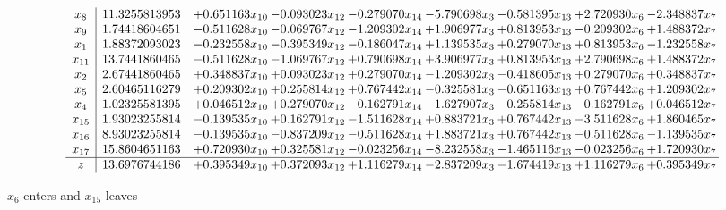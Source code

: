 \documentclass[10pt]{article}
\begin{document}
 \[\begin{array}{c| c c@{\hskip 2pt} c@{\hskip 2pt} c@{\hskip 2pt} c@{\hskip 2pt} c@{\hskip 2pt} c@{\hskip 2pt} c@{\hskip 2pt} }
 x_{8}   &  11.3255813953 & + 0.651163 x_{10} & -0.093023 x_{12} & -0.279070 x_{14} & -5.790698 x_{3} & -0.581395 x_{13} & + 2.720930 x_{6} & -2.348837 x_{7}\\
 x_{9}   &  1.74418604651 & -0.511628 x_{10} & -0.069767 x_{12} & -1.209302 x_{14} & + 1.906977 x_{3} & + 0.813953 x_{13} & -0.209302 x_{6} & + 1.488372 x_{7}\\
 x_{1}   &  1.88372093023 & -0.232558 x_{10} & -0.395349 x_{12} & -0.186047 x_{14} & + 1.139535 x_{3} & + 0.279070 x_{13} & + 0.813953 x_{6} & -1.232558 x_{7}\\
 x_{11}   &  13.7441860465 & -0.511628 x_{10} & -1.069767 x_{12} & + 0.790698 x_{14} & + 3.906977 x_{3} & + 0.813953 x_{13} & + 2.790698 x_{6} & + 1.488372 x_{7}\\
 x_{2}   &  2.67441860465 & + 0.348837 x_{10} & + 0.093023 x_{12} & + 0.279070 x_{14} & -1.209302 x_{3} & -0.418605 x_{13} & + 0.279070 x_{6} & + 0.348837 x_{7}\\
 x_{5}   &  2.60465116279 & + 0.209302 x_{10} & + 0.255814 x_{12} & + 0.767442 x_{14} & -0.325581 x_{3} & -0.651163 x_{13} & + 0.767442 x_{6} & + 1.209302 x_{7}\\
 x_{4}   &  1.02325581395 & + 0.046512 x_{10} & + 0.279070 x_{12} & -0.162791 x_{14} & -1.627907 x_{3} & -0.255814 x_{13} & -0.162791 x_{6} & + 0.046512 x_{7}\\
 x_{15}   &  1.93023255814 & -0.139535 x_{10} & + 0.162791 x_{12} & -1.511628 x_{14} & + 0.883721 x_{3} & + 0.767442 x_{13} & -3.511628 x_{6} & + 1.860465 x_{7}\\
 x_{16}   &  8.93023255814 & -0.139535 x_{10} & -0.837209 x_{12} & -0.511628 x_{14} & + 1.883721 x_{3} & + 0.767442 x_{13} & -0.511628 x_{6} & -1.139535 x_{7}\\
 x_{17}   &  15.8604651163 & + 0.720930 x_{10} & + 0.325581 x_{12} & -0.023256 x_{14} & -8.232558 x_{3} & -1.465116 x_{13} & -0.023256 x_{6} & + 1.720930 x_{7}\\
\hline
z    &  13.6976744186 & + 0.395349 x_{10} & + 0.372093 x_{12} & + 1.116279 x_{14} & -2.837209 x_{3} & -1.674419 x_{13} & + 1.116279 x_{6} & + 0.395349 x_{7}\\
\end{array}\]


 $ x_{6} $ enters and $ x_{15} $ leaves 
\end{document}
